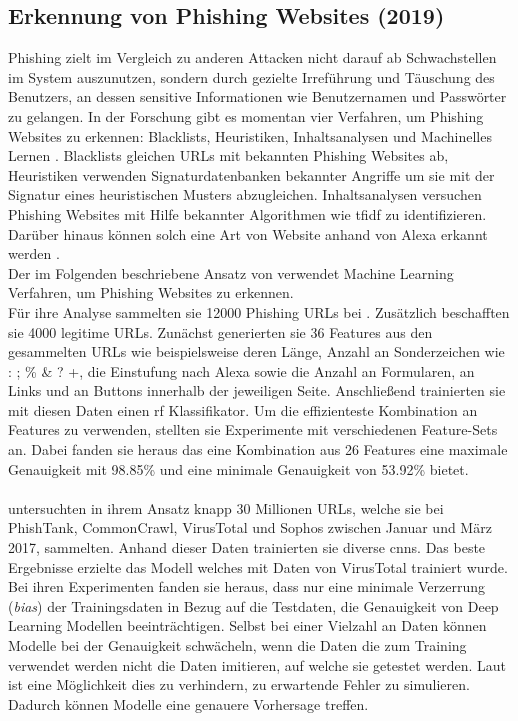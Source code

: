 \documentclass[
    12pt, %
    DIV10,
    ngerman, %
    a4paper, %
    oneside, %
    titlepage, %
    parskip=half, %
    headings=normal, %
    listof=totoc, %
    bibliography=totoc, %
    index=totoc, %
    captions=tableheading, %
    final %
]{scrreprt}
\begin{document}
\subsection{Erkennung von Phishing Websites (2019)}
Phishing zielt im Vergleich zu anderen Attacken nicht darauf ab Schwachstellen im System auszunutzen, sondern durch gezielte Irreführung und Täuschung des Benutzers, an dessen sensitive Informationen wie Benutzernamen und Passwörter zu gelangen.
In der Forschung gibt es momentan vier Verfahren, um Phishing Websites zu erkennen: Blacklists, Heuristiken, Inhaltsanalysen und Machinelles Lernen \parencite{Alswailem2019}. Blacklists gleichen URLs mit bekannten Phishing Websites ab, Heuristiken verwenden Signaturdatenbanken bekannter Angriffe um sie mit der Signatur eines heuristischen Musters abzugleichen. Inhaltsanalysen versuchen Phishing Websites mit Hilfe bekannter Algorithmen wie \ac{tfidf} zu identifizieren. Darüber hinaus können solch eine Art von Website anhand von Alexa erkannt werden \parencite{nguyen2013detecting}. \\
Der im Folgenden beschriebene Ansatz von \textcite{Alswailem2019} verwendet Machine Learning Verfahren, um Phishing Websites zu erkennen.\\
Für ihre Analyse sammelten sie 12000 Phishing URLs bei \textcite{PhishTank}. Zusätzlich beschafften sie 4000 legitime URLs. Zunächst generierten sie 36 Features aus den gesammelten URLs wie beispielsweise deren Länge, Anzahl an Sonderzeichen wie : ; \% \& ? +, die Einstufung nach Alexa sowie die Anzahl an Formularen, an Links und an Buttons innerhalb der jeweiligen Seite. Anschlie{\ss}end trainierten sie mit diesen Daten einen \ac{rf} Klassifikator. Um die effizienteste Kombination an Features zu verwenden, stellten sie Experimente mit verschiedenen Feature-Sets an. Dabei fanden sie heraus das eine Kombination aus 26 Features eine maximale Genauigkeit mit 98.85\% und eine minimale Genauigkeit von 53.92\% bietet. 
\\\\
\textcite{Hillary2017} untersuchten in ihrem Ansatz knapp 30 Millionen URLs, welche sie bei PhishTank, CommonCrawl, VirusTotal und Sophos zwischen Januar und März 2017, sammelten. Anhand dieser Daten trainierten sie diverse \ac{cnns}. Das beste Ergebnisse erzielte das Modell welches mit Daten von VirusTotal trainiert wurde. Bei ihren Experimenten fanden sie heraus, dass nur eine minimale Verzerrung (\emph{bias}) der Trainingsdaten in Bezug auf die Testdaten, die Genauigkeit von Deep Learning Modellen beeinträchtigen. Selbst bei einer Vielzahl an Daten können Modelle bei der Genauigkeit schwächeln, wenn die Daten die zum Training verwendet werden nicht die Daten imitieren, auf welche sie getestet werden. Laut \citeauthor{Hillary2017} ist eine Möglichkeit dies zu verhindern, zu erwartende Fehler zu simulieren. Dadurch können Modelle eine genauere Vorhersage treffen.
%
\end{document}

